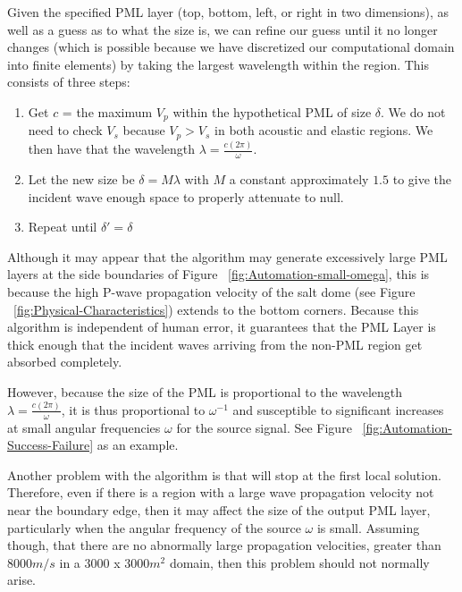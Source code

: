 Given the specified PML layer (top, bottom, left, or right in two dimensions), as well as a guess as to what the size is, we can refine our guess until it no longer changes (which is possible because we have discretized our computational domain into finite elements) by taking the largest wavelength within the region. This consists of three steps:

\begin{enumerate}
\item Get $c$ = the maximum $V_p$ within the hypothetical PML of size $\delta$. We do not need to check $V_s$ because $V_p > V_s$ in both acoustic and elastic regions. We then have that the wavelength $\lambda = \frac{c (2 \pi)}{\omega}$.
\item Let the new size be $\delta =  M \lambda$ with $M$ a constant approximately $1.5$ to give the incident wave enough space to properly attenuate to null.
\item Repeat until $\delta' = \delta$
\end{enumerate}

Although it may appear that the algorithm may generate excessively large PML layers at the side boundaries of Figure ~\ref{fig:Automation-small-omega}, this is because the high P-wave propagation velocity of the salt dome (see Figure ~\ref{fig:Physical-Characteristics}) extends to the bottom corners. Because this algorithm is independent of human error, it guarantees that the PML Layer is thick enough that the incident waves arriving from the non-PML region get absorbed completely. 

However, because the size of the PML is proportional to the wavelength $\lambda = \frac{c (2 \pi)}{\omega}$, it is thus proportional to $\omega^{-1}$ and susceptible to significant increases at small angular frequencies $\omega$ for the source signal. See Figure ~\ref{fig:Automation-Success-Failure} as an example.

Another problem with the algorithm is that will stop at the first local solution. Therefore, even if there is a region with a large wave propagation velocity not near the boundary edge, then it may affect the size of the output PML layer, particularly when the angular frequency of the source $\omega$ is small. Assuming though, that there are no abnormally large propagation velocities, greater than $8000 m/s$ in a $3000$ x $3000 m^2$ domain, then this problem should not normally arise.

